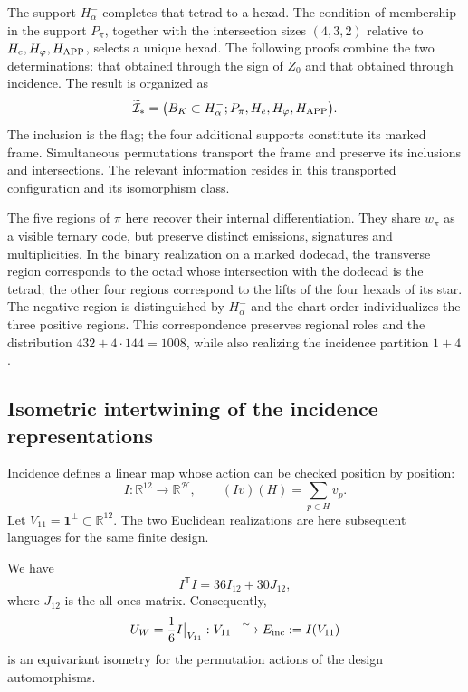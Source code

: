 The support $H^-_\alpha$ completes that tetrad to a hexad. The
condition of membership in the support $P_\pi$, together with the intersection
sizes $(4,3,2)$ relative to $H_e,H_\varphi,H_{\rm APP}$,
selects a unique hexad. The following proofs combine the two
determinations: that obtained through the sign of $Z_0$ and that obtained
through incidence. The result is organized as
\begin{equation}
 \widetilde{\mathcal I}_*
 =\bigl(B_K\subset H^-_\alpha;
         P_\pi,H_e,H_\varphi,H_{\rm APP}\bigr).
 \label{x_reciprocidad:inc-ampl-marco}
\end{equation}
The inclusion is the flag; the four additional supports constitute
its marked frame. Simultaneous permutations transport the frame and
preserve its inclusions and intersections. The relevant information resides
in this transported configuration and its isomorphism class.

The five regions of $\pi$ here recover their internal differentiation.
They share $w_\pi$ as a visible ternary code, but preserve distinct emissions,
signatures and multiplicities. In the binary realization on a
marked dodecad, the transverse region corresponds to the octad whose
intersection with the dodecad is the tetrad; the other four regions
correspond to the lifts of the four hexads of its star. The
negative region is distinguished by $H^-_\alpha$ and the chart order
individualizes the three positive regions. This correspondence preserves
regional roles and the distribution $432+4\cdot144=1008$, while also
realizing the incidence partition $1+4$.



\subsection{Isometric intertwining of the incidence representations}
\label{x_reciprocidad:exc:entrelazador}

Incidence defines a linear map whose action can be checked
position by position:
\begin{equation}
 I:\mathbb R^{12}\longrightarrow\mathbb R^{\mathcal H},
 \qquad (Iv)(H)=\sum_{p\in H}v_p.
 \label{x_reciprocidad:exc:incidencia}
\end{equation}
Let $V_{11}=\mathbf1^\perp\subset\mathbb R^{12}$. The two Euclidean
realizations are here subsequent languages for the same finite design.

\begin{proposition}
\label{x_reciprocidad:exc:isometria}
We have
\[
 I^{\mathsf T}I=36I_{12}+30J_{12},
\]
where $J_{12}$ is the all-ones matrix. Consequently,
\[
 U_W=\frac16 I\big|_{V_{11}}:
 V_{11}\xrightarrow{\ \sim\ }E_{\rm inc}:=I(V_{11})
\]
is an equivariant isometry for the permutation actions of the
design automorphisms.
\end{proposition}

